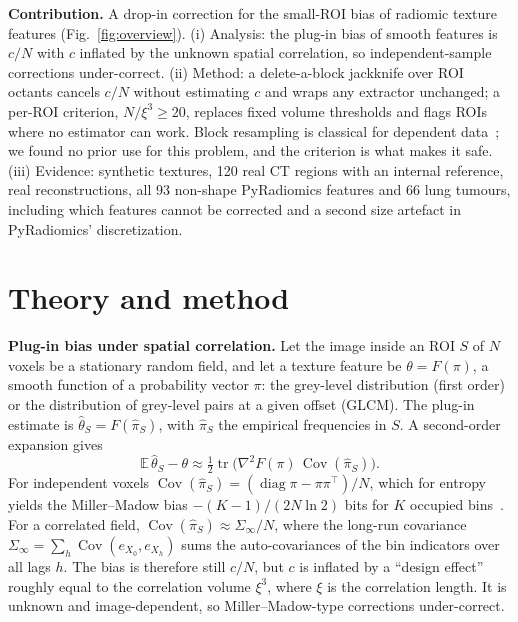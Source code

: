 \documentclass{article}
\begin{document}
\noindent\textbf{Contribution.} A drop-in correction for the small-ROI bias of radiomic texture features (Fig.~\ref{fig:overview}). (i) Analysis: the plug-in bias of smooth features is $c/N$ with $c$ inflated by the unknown spatial correlation, so independent-sample corrections under-correct. (ii) Method: a delete-a-block jackknife over ROI octants cancels $c/N$ without estimating $c$ and wraps any extractor unchanged; a per-ROI criterion, $N/\xi^3\ge20$, replaces fixed volume thresholds and flags ROIs where no estimator can work. Block resampling is classical for dependent data~\cite{kunsch1989,lahiri2003}; we found no prior use for this problem, and the criterion is what makes it safe. (iii) Evidence: synthetic textures, 120 real CT regions with an internal reference, real reconstructions, all 93 non-shape PyRadiomics features and 66 lung tumours, including which features cannot be corrected and a second size artefact in PyRadiomics' discretization.



\section{Theory and method}
\label{sec:method}
\noindent\textbf{Plug-in bias under spatial correlation.} Let the image inside an ROI $S$ of $N$ voxels be a stationary random field, and let a texture feature be $\theta=F(\pi)$, a smooth function of a probability vector $\pi$: the grey-level distribution (first order) or the distribution of grey-level pairs at a given offset (GLCM). The plug-in estimate is $\hat\theta_S=F(\hat\pi_S)$, with $\hat\pi_S$ the empirical frequencies in $S$. A second-order expansion gives
\begin{equation}
\mathbb{E}\,\hat\theta_S-\theta\approx\tfrac12\operatorname{tr}\!\big(\nabla^2F(\pi)\,\operatorname{Cov}(\hat\pi_S)\big).
\label{eq:bias}
\end{equation}
For independent voxels $\operatorname{Cov}(\hat\pi_S)=(\operatorname{diag}\pi-\pi\pi^\top)/N$, which for entropy yields the Miller--Madow bias $-(K-1)/(2N\ln2)$ bits for $K$ occupied bins~\cite{miller1955}. For a correlated field, $\operatorname{Cov}(\hat\pi_S)\approx\Sigma_\infty/N$, where the long-run covariance $\Sigma_\infty=\sum_{h}\operatorname{Cov}(e_{X_0},e_{X_h})$ sums the auto-covariances of the bin indicators over all lags $h$. The bias is therefore still $c/N$, but $c$ is inflated by a ``design effect'' roughly equal to the correlation volume $\xi^3$, where $\xi$ is the correlation length. It is unknown and image-dependent, so Miller--Madow-type corrections under-correct.
\end{document}

